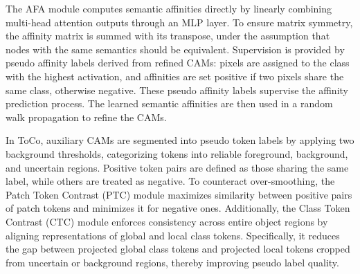 The AFA module computes semantic affinities directly by linearly combining multi-head attention outputs through an MLP layer. To ensure matrix symmetry, the affinity matrix is summed with its transpose, under the assumption that nodes with the same semantics should be equivalent. Supervision is provided by pseudo affinity labels derived from refined CAMs: pixels are assigned to the class with the highest activation, and affinities are set positive if two pixels share the same class, otherwise negative. These pseudo affinity labels supervise the affinity prediction process. The learned semantic affinities are then used in a random walk propagation to refine the CAMs.

In ToCo, auxiliary CAMs are segmented into pseudo token labels by applying two background thresholds, categorizing tokens into reliable foreground, background, and uncertain regions. Positive token pairs are defined as those sharing the same label, while others are treated as negative. To counteract over-smoothing, the Patch Token Contrast (PTC) module maximizes similarity between positive pairs of patch tokens and minimizes it for negative ones. Additionally, the Class Token Contrast (CTC) module enforces consistency across entire object regions by aligning representations of global and local class tokens. Specifically, it reduces the gap between projected global class tokens and projected local tokens cropped from uncertain or background regions, thereby improving pseudo label quality.

